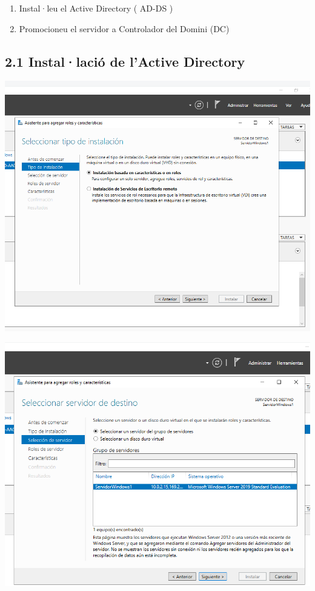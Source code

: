 \documentclass[
  a4paper,
]{article}
\providecommand{\tightlist}{%
  \setlength{\itemsep}{0pt}\setlength{\parskip}{0pt}}
\begin{document}
\begin{enumerate}
\def\labelenumi{\arabic{enumi}.}
\tightlist
\item
  Instal·leu el Active Directory ( AD-DS )
\item
  Promocioneu el servidor a Controlador del Domini (DC)
\end{enumerate}

\subsection{2.1 Instal·lació de l'Active
Directory}\label{installaciuxf3-de-lactive-directory}

\includegraphics{png/instalAD1.png}

\includegraphics{png/instalAD2.png}
\end{document}
